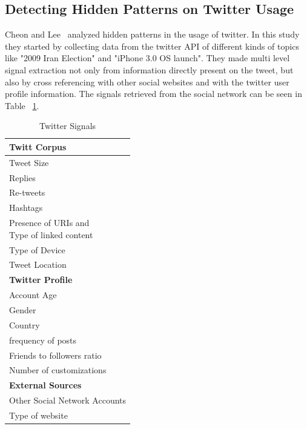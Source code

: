 \subsection{Detecting Hidden Patterns on Twitter Usage} 
\label{sub:detecting_hidden_patterns_on_twitter_usage}
Cheon and Lee~\citep{Cheong2010} analyzed hidden patterns in the usage of twitter. In this study they started by collecting data from the twitter API of different kinds of topics like "2009 Iran Election" and "iPhone 3.0 OS launch". They made multi level signal extraction not only from information directly present on the tweet, but also by cross referencing with other social websites and with the twitter user profile information. The signals retrieved from the social network can be seen in Table ~\ref{tab:twitter_signals}.

\begin{table}[H]
  \caption{Twitter Signals}
  \label{tab:twitter_signals}
  \begin{center}
    \begin{tabular}{|l|}
      \hline
      \textbf{Twitt Corpus}  \\
      \hline
      Tweet Size \\
      \hline
      Replies \\
      \hline
      Re-tweets \\
      \hline
      Hashtags  \\
      \hline
      \specialcell{Presence of URIs and \\ Type of linked content} \\
      \hline
      Type of Device   \\
      \hline
      Tweet Location  \\
      \hline                 
      \hline                 
      \textbf{Twitter Profile} \\ 
      \hline
      Account Age   \\
      \hline
      Gender     \\
      \hline
      Country \\    
      \hline
      frequency of posts \\
      \hline
      Friends to followers ratio \\ 
      \hline
      Number of  customizations \\   
      \hline
      \hline
      \textbf{External Sources} \\
      \hline
      Other Social Network Accounts   \\
      \hline
      Type of website\\ 
      \hline
    \end{tabular}
  \end{center}
\end{table}

